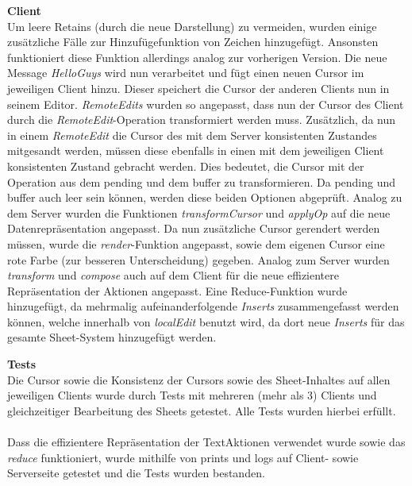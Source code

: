 \documentclass{rp}
\begin{document}
\textbf{Client}\\
Um leere Retains (durch die neue Darstellung) zu vermeiden, wurden einige zusätzliche Fälle zur Hinzufügefunktion von Zeichen hinzugefügt. Ansonsten funktioniert diese Funktion allerdings analog zur vorherigen Version.
Die neue Message \textit{HelloGuys} wird nun verarbeitet und fügt einen neuen Cursor im jeweiligen Client hinzu. Dieser speichert die Cursor der anderen Clients nun in seinem Editor. \textit{RemoteEdits} wurden so angepasst, dass nun der Cursor des Client durch die \textit{RemoteEdit}-Operation transformiert werden muss. Zusätzlich, da nun in einem \textit{RemoteEdit} die Cursor des mit dem Server konsistenten Zustandes mitgesandt werden, müssen diese ebenfalls in einen mit dem jeweiligen Client konsistenten Zustand gebracht werden. Dies bedeutet, die Cursor mit der Operation aus dem pending und dem buffer zu transformieren. Da pending und buffer auch leer sein können, werden diese beiden Optionen abgeprüft.
Analog zu dem Server wurden die Funktionen \textit{transformCursor} und \textit{applyOp} auf die neue Datenrepräsentation angepasst.
Da nun zusätzliche Cursor gerendert werden müssen, wurde die \textit{render}-Funktion angepasst, sowie dem eigenen Cursor eine rote Farbe (zur besseren Unterscheidung) gegeben.
Analog zum Server wurden \textit{transform} und \textit{compose} auch auf dem Client für die neue effizientere Repräsentation der Aktionen angepasst.
Eine Reduce-Funktion wurde hinzugefügt, da mehrmalig aufeinanderfolgende \textit{Inserts} zusammengefasst werden können, welche innerhalb von \textit{localEdit} benutzt wird, da dort neue \textit{Inserts} für das gesamte Sheet-System hinzugefügt werden.


\textbf{Tests}\\
Die Cursor sowie die Konsistenz der Cursors sowie des Sheet-Inhaltes auf allen jeweiligen Clients wurde durch Tests mit mehreren (mehr als 3) Clients und gleichzeitiger Bearbeitung des Sheets getestet. Alle Tests wurden hierbei erfüllt.\\\\
Dass die effizientere Repräsentation der TextAktionen verwendet wurde sowie das \textit{reduce} funktioniert, wurde mithilfe von prints und logs auf Client- sowie Serverseite getestet und die Tests wurden bestanden. 
\end{document}
